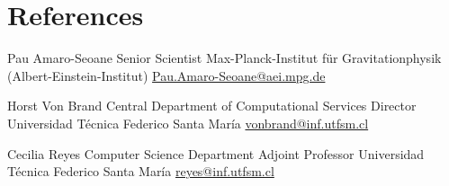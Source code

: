 \documentclass[11pt,a4paper]{moderncv}
\begin{document}

\section{References}
    \cventry{}
            {Pau Amaro-Seoane}
            {Senior Scientist}
            {Max-Planck-Institut für Gravitationphysik (Albert-Einstein-Institut)}
            {\url{Pau.Amaro-Seoane@aei.mpg.de}}
            {}

    \cventry{}
            {Horst Von Brand}
            {Central Department of Computational Services Director}
            {Universidad Técnica Federico Santa María}
            {\url{vonbrand@inf.utfsm.cl}}
            {}

    \cventry{}
            {Cecilia Reyes}
            {Computer Science Department Adjoint Professor}
            {Universidad Técnica Federico Santa María}
            {\url{reyes@inf.utfsm.cl}}
            {}

\nocite{*}


\end{document}
